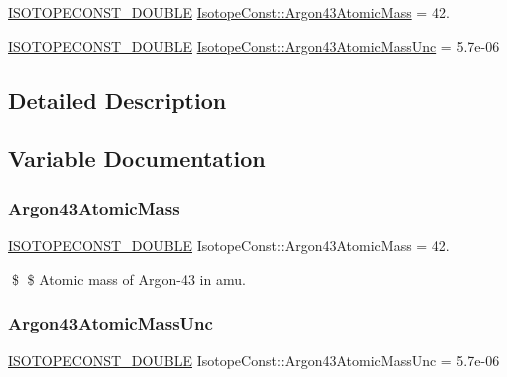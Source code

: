 \begin{DoxyCompactItemize}
\item 
\mbox{\hyperlink{group___isotope_const-_macros_ga8f45a7272ce02c0b4c65c44636ed719a}{I\+S\+O\+T\+O\+P\+E\+C\+O\+N\+S\+T\+\_\+\+D\+O\+U\+B\+LE}} \mbox{\hyperlink{group___isotope_const-_argon-_ar43_gaf32d4b22075a4eca1e51e75dfece523f}{Isotope\+Const\+::\+Argon43\+Atomic\+Mass}} = 42.
\item 
\mbox{\hyperlink{group___isotope_const-_macros_ga8f45a7272ce02c0b4c65c44636ed719a}{I\+S\+O\+T\+O\+P\+E\+C\+O\+N\+S\+T\+\_\+\+D\+O\+U\+B\+LE}} \mbox{\hyperlink{group___isotope_const-_argon-_ar43_ga28bccffdd898aefef6dea778df5873f0}{Isotope\+Const\+::\+Argon43\+Atomic\+Mass\+Unc}} = 5.\+7e-\/06
\end{DoxyCompactItemize}


\subsection{Detailed Description}


\subsection{Variable Documentation}
\mbox{\label{group___isotope_const-_argon-_ar43_gaf32d4b22075a4eca1e51e75dfece523f}} 
\subsubsection{\texorpdfstring{Argon43\+Atomic\+Mass}{Argon43AtomicMass}}
{\footnotesize\ttfamily \mbox{\hyperlink{group___isotope_const-_macros_ga8f45a7272ce02c0b4c65c44636ed719a}{I\+S\+O\+T\+O\+P\+E\+C\+O\+N\+S\+T\+\_\+\+D\+O\+U\+B\+LE}} Isotope\+Const\+::\+Argon43\+Atomic\+Mass = 42.}

\$ \$ Atomic mass of Argon-\/43 in amu. \mbox{\label{group___isotope_const-_argon-_ar43_ga28bccffdd898aefef6dea778df5873f0}} 
\subsubsection{\texorpdfstring{Argon43\+Atomic\+Mass\+Unc}{Argon43AtomicMassUnc}}
{\footnotesize\ttfamily \mbox{\hyperlink{group___isotope_const-_macros_ga8f45a7272ce02c0b4c65c44636ed719a}{I\+S\+O\+T\+O\+P\+E\+C\+O\+N\+S\+T\+\_\+\+D\+O\+U\+B\+LE}} Isotope\+Const\+::\+Argon43\+Atomic\+Mass\+Unc = 5.\+7e-\/06}

